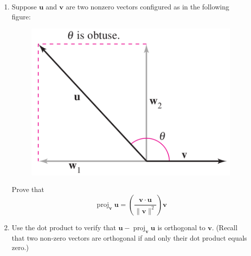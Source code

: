 \documentclass[11pt]{article}
\title{}
\date{}
\newcommand{\norm}[1]{\lVert #1 \rVert}
\DeclareMathOperator{\proj}{proj}
\begin{document}
\begin{enumerate}
\item
Suppose $\mathbf u$ and $\mathbf v$ are two nonzero vectors configured as in the following figure:
\begin{figure}[h]
\includegraphics[width = .25\textwidth, center]{proj2.png}
\end{figure}

Prove that 
\begin{equation*}
\label{vecproj}
\proj_{\mathbf v}\mathbf u = \left(\frac{\mathbf v\cdot\mathbf u}{\norm{\mathbf v}^2}\right)\mathbf v
\end{equation*}

\item
Use the dot product to verify that $\mathbf u- \proj_{\mathbf v}\mathbf u $ is orthogonal to $\mathbf v$. (Recall that two non-zero vectors are orthogonal if and only their dot product equals zero.)
\end{enumerate}
\end{document}
